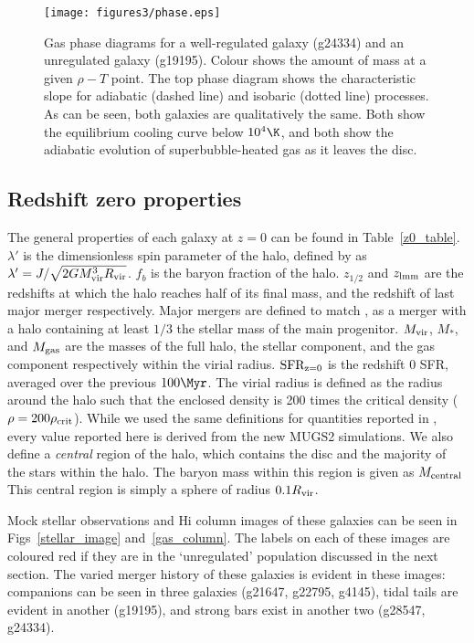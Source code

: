 \begin{figure}
    \texttt{[image: figures3/phase.eps]}
    \caption[Gas phase diagram in two MUGS2 galaxies]{Gas phase diagrams for a
    well-regulated galaxy (g24334) and an unregulated galaxy (g19195).  Colour
    shows the amount of mass at a given $\rho-T$ point.  The top phase diagram
    shows the characteristic slope for adiabatic (dashed line) and isobaric
    (dotted line) processes.  As can be seen, both galaxies are qualitatively
    the same.  Both show the equilibrium cooling curve below $10^4\K$, and both
    show the adiabatic evolution of superbubble-heated gas as it leaves the
    disc.}
    \label{phase}
\end{figure}

\subsection{Redshift zero properties}

The general properties of each galaxy at $z=0$ can be found in
Table~\ref{z0_table}.  $\lambda'$ is the dimensionless spin parameter of the
halo, defined by \citet{Bullock2001} as $\lambda'=J/\sqrt{2GM_{\rm vir}^3R_{\rm vir}}$.
$f_b$ is the baryon fraction of the halo.  $z_{1/2}$ and $z_{\rm lmm}$ are the
redshifts at which the halo reaches half of its final mass, and the redshift of
last major merger respectively.  Major mergers are defined to match
\citet{Stinson2010}, as a merger with a halo containing at least $1/3$ the
stellar mass of the main progenitor.  $M_{\rm vir}$, $M_*$, and $M_{\rm gas}$ are the
masses of the full halo, the stellar component, and the gas component
respectively within the virial radius.  $\rm{SFR_{\rm z=0}}$ is the redshift 0 
SFR, averaged over the previous $100\Myr$.  The virial radius
is defined as the radius around the halo such that the enclosed density is 200
times the critical density ($\rho=200\rho_{\rm crit}$).  While we used the same
definitions for quantities reported in \citet{Stinson2010}, every value reported
here is derived from the new MUGS2 simulations.  We also define a {\it central}
region of the halo, which contains the disc and the majority of the stars within
the halo.  The baryon mass within this region is given as $M_{\rm central}$  This
central region is simply a sphere of radius $0.1R_{\rm vir}$.

Mock stellar observations and {\sc Hi} column images of these galaxies can be
seen in Figs~\ref{stellar_image} and~\ref{gas_column}.  The labels on each of
these images are coloured red if they are in the `unregulated' population
discussed in the next section.  The varied merger history of these galaxies is
evident in these images: companions can be seen in three galaxies (g21647,
g22795, g4145), tidal tails are evident in another  (g19195), and strong bars
exist in another two (g28547, g24334).  

